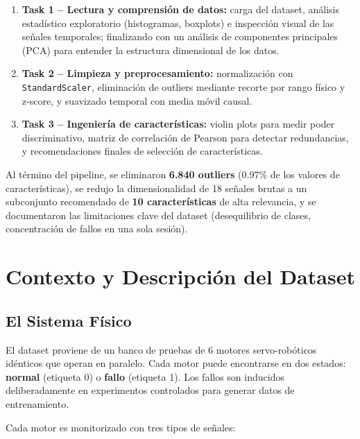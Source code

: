 \documentclass[12pt,a4paper]{article}
\begin{document}
\begin{enumerate}[leftmargin=2em]
  \item \textbf{Task 1 – Lectura y comprensión de datos:} carga del dataset, análisis
    estadístico exploratorio (histogramas, boxplots) e inspección visual de las señales
    temporales; finalizando con un análisis de componentes principales (PCA) para
    entender la estructura dimensional de los datos.

  \item \textbf{Task 2 – Limpieza y preprocesamiento:} normalización con
    \texttt{StandardScaler}, eliminación de outliers mediante recorte por rango físico
    y z-score, y suavizado temporal con media móvil causal.

  \item \textbf{Task 3 – Ingeniería de características:} violin plots para medir poder
    discriminativo, matriz de correlación de Pearson para detectar redundancias,
    y recomendaciones finales de selección de características.
\end{enumerate}

Al término del pipeline, se eliminaron \textbf{6.840 outliers} (0.97\% de los valores
de características), se redujo la dimensionalidad de 18 señales brutas a un subconjunto
recomendado de \textbf{10 características} de alta relevancia, y se documentaron las
limitaciones clave del dataset (desequilibrio de clases, concentración de fallos en
una sola sesión).

\tableofcontents
\newpage

\section{Contexto y Descripción del Dataset}

\subsection{El Sistema Físico}

El dataset proviene de un banco de pruebas de 6 motores servo-robóticos idénticos
que operan en paralelo. Cada motor puede encontrarse en dos estados:
\textbf{normal} (etiqueta 0) o \textbf{fallo} (etiqueta 1).
Los fallos son inducidos deliberadamente en experimentos controlados para generar
datos de entrenamiento.

Cada motor es monitorizado con tres tipos de señales:
\end{document}
